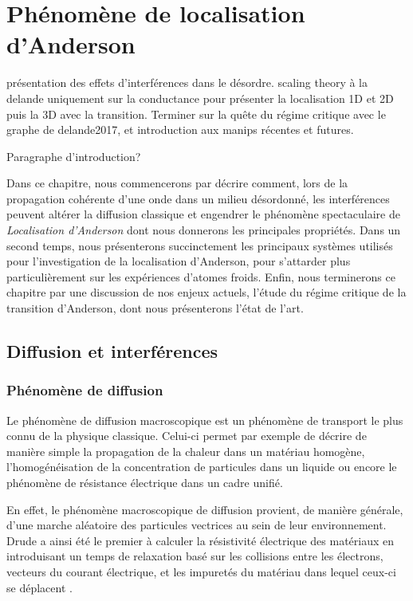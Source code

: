 \chapter{Phénomène de localisation d'Anderson} %

présentation des effets d'interférences dans le désordre. scaling theory à la delande uniquement sur la conductance pour présenter la localisation 1D et 2D puis la 3D avec la transition. Terminer sur la quête du régime critique avec le graphe de delande2017, et introduction aux manips récentes et futures.


Paragraphe d'introduction? 

Dans ce chapitre, nous commencerons par décrire comment, lors de la propagation cohérente d'une onde dans un milieu désordonné, les interférences peuvent altérer la diffusion classique et engendrer le phénomène spectaculaire de \emph{Localisation d'Anderson} dont nous donnerons les principales propriétés. Dans un second temps, nous présenterons succinctement les principaux systèmes utilisés pour l'investigation de la localisation d'Anderson, pour s'attarder plus particulièrement sur les expériences d'atomes froids. Enfin, nous terminerons ce chapitre par une discussion de nos enjeux actuels, l'étude du régime critique de la transition d'Anderson, dont nous présenterons l'état de l'art.

\section{Diffusion et interférences}
\subsection{Phénomène de diffusion}
\label{sc:diffusion_classique}
Le phénomène de diffusion macroscopique est un phénomène de transport le plus connu de la physique classique. Celui-ci permet par exemple de décrire de manière simple la propagation de la chaleur dans un matériau homogène, l'homogénéisation de la concentration de particules dans un liquide ou encore le phénomène de résistance électrique dans un cadre unifié. 

En effet, le phénomène macroscopique de diffusion provient, de manière générale, d'une marche aléatoire des particules vectrices au sein de leur environnement. Drude a ainsi été le premier à calculer la résistivité électrique des matériaux en introduisant un temps de relaxation basé sur les collisions entre les électrons, vecteurs du courant électrique, et les impuretés du matériau dans lequel ceux-ci se déplacent \citep{ashcroft2010solid}. 

